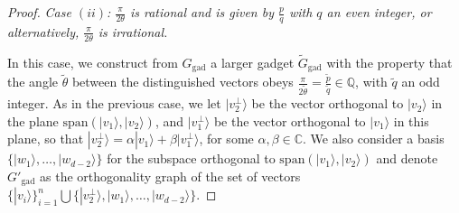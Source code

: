 \documentclass[twocolumn, a4paper, superscriptaddress,nofootinbib, accepted=2020-08-07, hyperref]{quantumarticle}
\begin{document}
\begin{proof}
\emph{Case $(ii)$: $\frac{\pi}{2 \theta}$ is rational and is given by $\frac{p}{q}$ with $q$ an even integer, or alternatively, $\frac{\pi}{2 \theta}$ is irrational.}
	
	In this case, we construct from $G_{\text{gad}}$ a larger gadget $\tilde{G}_{\text{gad}}$ with the property that the angle $\tilde{\theta}$ between the distinguished vectors obeys $\frac{\pi}{2 \tilde{\theta}} = \frac{\tilde{p}}{\tilde{q}} \in \mathbb{Q}$, with $\tilde{q}$ an odd integer. 
	As in the previous case, we let $|v_2^{\perp} \rangle$ be the vector orthogonal to $|v_2 \rangle$ in the plane $\text{span}(|v_1 \rangle, |v_2 \rangle)$, and $| v_1^{\perp} \rangle$ be the vector orthogonal to $|v_1 \rangle$ in this plane, so that $|v_2^{\perp} \rangle = \alpha | v_1 \rangle + \beta | v_1^{\perp} \rangle$,
	for some $\alpha, \beta \in \mathbb{C}$. We also consider a basis $\{|w_1 \rangle, \dots, |w_{d-2} \rangle \}$ for the subspace orthogonal to $\text{span}(|v_1 \rangle, |v_2 \rangle)$ and denote $G'_{\text{gad}}$ as the orthogonality graph of the set of vectors $\{|v_i \rangle\}_{i=1}^n \bigcup \{|v_2^{\perp} \rangle, |w_1 \rangle, \dots, |w_{d-2}\rangle\}$.
	

\end{proof}
\end{document}
